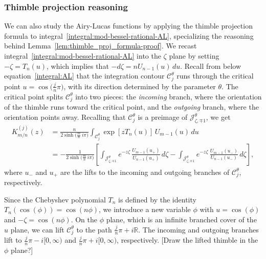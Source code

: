 \documentclass{article}
\newcommand{\R}{\mathbb{R}}
\theoremstyle{definition}
\theoremstyle{plain}
\newenvironment{todo}{\color{Coral}}{\color{black}}
\begin{document}
\subsubsection{Thimble projection reasoning}\label{contour-argument-AL}
We can also study the Airy-Lucas functions by applying the thimble projection formula to integral~\eqref{integral:mod-bessel-rational-AL}, specializing the reasoning behind Lemma~\ref{lem:thimble_proj_formula-proof}. We recast integral~\eqref{integral:mod-bessel-rational-AL} into the $\zeta$ plane by setting $-\zeta = T_n(u)$, which implies that $-d\zeta = n U_{n-1}(u)\,du$. Recall from below equation~\eqref{integral:AL} that the integration contour $\mathcal{C}^\theta_j$ runs through the critical point $u = \cos\big(\tfrac{j}{n}\pi\big)$, with its direction determined by the parameter $\theta$. The critical point splits $\mathcal{C}^\theta_j$ into two pieces: the {\em incoming} branch, where the orientation of the thimble runs toward the critical point, and the {\em outgoing} branch, where the orientation points away. Recalling that $\mathcal{C}^\theta_j$ is a preimage of $\mathcal{J}^\theta_{\zeta, \mp 1}$, we get
\begin{align*}%
K^{(j)}_{m/n}(z) & = \frac{n}{2 \sinh\big(\tfrac{m}{n}\,i\pi\big)} \int_{\mathcal{C}^\theta_j} \exp\left[z T_n(u)\right]\,U_{m-1}(u)\,du \\
& = -\frac{1}{2\sinh\big(\tfrac{m}{n}\,i\pi\big)} \left[ \int_{\mathcal{J}^\theta_{\zeta, \mp 1}} e^{-z\zeta}\,\frac{U_{m-1}(u_+)}{U_{n-1}(u_+)}\,d\zeta - \int_{\mathcal{J}^\theta_{\zeta, \mp 1}} e^{-z\zeta}\,\frac{U_{m-1}(u_-)}{U_{n-1}(u_-)}\,d\zeta \right],
\end{align*}
where $u_-$ and $u_+$ are the lifts to the incoming and outgoing branches of $\mathcal{C}^\theta_j$, respectively.

Since the Chebyshev polynomial $T_n$ is defined by the identity $T_n(\cos(\phi)) = \cos(n\phi)$, we introduce a new variable $\phi$ with $u = \cos(\phi)$ and $-\zeta = \cos(n\phi)$. On the $\phi$ plane, which is an infinite branched cover of the $u$ plane, we can lift $\mathcal{C}^\theta_j$ to the path $\tfrac{j}{n}\pi + i\R$. The incoming and outgoing branches lift to $\tfrac{j}{n}\pi - i[0, \infty)$ and $\tfrac{j}{n}\pi + i[0, \infty)$, respectively. \begin{todo}[Draw the lifted thimble in the $\phi$ plane?]\end{todo}
\end{document}

